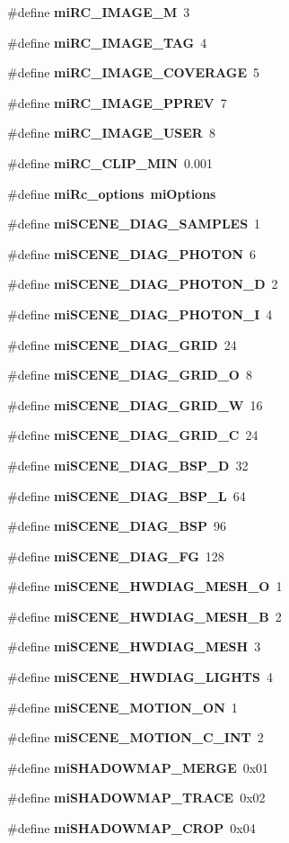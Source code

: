 \begin{CompactItemize}
\#define {\bf mi\-RC\_\-IMAGE\_\-M}\ 3
\item 
\#define {\bf mi\-RC\_\-IMAGE\_\-TAG}\ 4
\item 
\#define {\bf mi\-RC\_\-IMAGE\_\-COVERAGE}\ 5
\item 
\#define {\bf mi\-RC\_\-IMAGE\_\-PPREV}\ 7
\item 
\#define {\bf mi\-RC\_\-IMAGE\_\-USER}\ 8
\item 
\#define {\bf mi\-RC\_\-CLIP\_\-MIN}\ 0.001
\item 
\#define {\bf mi\-Rc\_\-options}\ {\bf mi\-Options}
\item 
\#define {\bf mi\-SCENE\_\-DIAG\_\-SAMPLES}\ 1
\item 
\#define {\bf mi\-SCENE\_\-DIAG\_\-PHOTON}\ 6
\item 
\#define {\bf mi\-SCENE\_\-DIAG\_\-PHOTON\_\-D}\ 2
\item 
\#define {\bf mi\-SCENE\_\-DIAG\_\-PHOTON\_\-I}\ 4
\item 
\#define {\bf mi\-SCENE\_\-DIAG\_\-GRID}\ 24
\item 
\#define {\bf mi\-SCENE\_\-DIAG\_\-GRID\_\-O}\ 8
\item 
\#define {\bf mi\-SCENE\_\-DIAG\_\-GRID\_\-W}\ 16
\item 
\#define {\bf mi\-SCENE\_\-DIAG\_\-GRID\_\-C}\ 24
\item 
\#define {\bf mi\-SCENE\_\-DIAG\_\-BSP\_\-D}\ 32
\item 
\#define {\bf mi\-SCENE\_\-DIAG\_\-BSP\_\-L}\ 64
\item 
\#define {\bf mi\-SCENE\_\-DIAG\_\-BSP}\ 96
\item 
\#define {\bf mi\-SCENE\_\-DIAG\_\-FG}\ 128
\item 
\#define {\bf mi\-SCENE\_\-HWDIAG\_\-MESH\_\-O}\ 1
\item 
\#define {\bf mi\-SCENE\_\-HWDIAG\_\-MESH\_\-B}\ 2
\item 
\#define {\bf mi\-SCENE\_\-HWDIAG\_\-MESH}\ 3
\item 
\#define {\bf mi\-SCENE\_\-HWDIAG\_\-LIGHTS}\ 4
\item 
\#define {\bf mi\-SCENE\_\-MOTION\_\-ON}\ 1
\item 
\#define {\bf mi\-SCENE\_\-MOTION\_\-C\_\-INT}\ 2
\item 
\#define {\bf mi\-SHADOWMAP\_\-MERGE}\ 0x01
\item 
\#define {\bf mi\-SHADOWMAP\_\-TRACE}\ 0x02
\item 
\#define {\bf mi\-SHADOWMAP\_\-CROP}\ 0x04
\item 

\end{CompactItemize}
